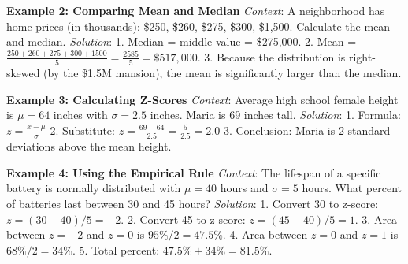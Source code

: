 \textbf{Example 2: Comparing Mean and Median}
\textit{Context}: A neighborhood has home prices (in thousands): \$250, \$260, \$275, \$300, \$1,500. Calculate the mean and median.
\textit{Solution}:
1. Median = middle value = \$275,000.
2. Mean = $\frac{250+260+275+300+1500}{5} = \frac{2585}{5} = \$517,000$.
3. Because the distribution is right-skewed (by the \$1.5M mansion), the mean is significantly larger than the median.

\textbf{Example 3: Calculating Z-Scores}
\textit{Context}: Average high school female height is $\mu = 64$ inches with $\sigma = 2.5$ inches. Maria is 69 inches tall.
\textit{Solution}:
1. Formula: $z = \frac{x - \mu}{\sigma}$
2. Substitute: $z = \frac{69 - 64}{2.5} = \frac{5}{2.5} = 2.0$
3. Conclusion: Maria is 2 standard deviations above the mean height.

\textbf{Example 4: Using the Empirical Rule}
\textit{Context}: The lifespan of a specific battery is normally distributed with $\mu = 40$ hours and $\sigma = 5$ hours. What percent of batteries last between 30 and 45 hours?
\textit{Solution}:
1. Convert 30 to z-score: $z = (30-40)/5 = -2$.
2. Convert 45 to z-score: $z = (45-40)/5 = 1$.
3. Area between $z=-2$ and $z=0$ is $95\% / 2 = 47.5\%$.
4. Area between $z=0$ and $z=1$ is $68\% / 2 = 34\%$.
5. Total percent: $47.5\% + 34\% = 81.5\%$.

